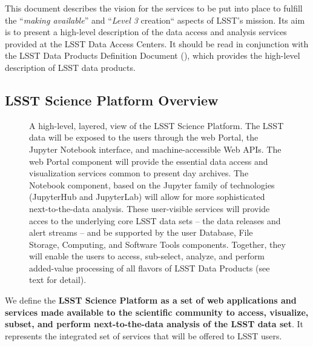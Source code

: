 \documentclass[DM,lsstdraft,toc]{lsstdoc}
\begin{document}
This document describes the vision for the services to be put into place to
fulfill the ``\emph{making available}'' and ``\emph{Level 3} creation``
aspects of LSST's mission. Its aim is to present a high-level
description of the data access and analysis services provided at the
LSST Data Access Centers. It should be read in conjunction with the
LSST Data Products Definition Document (\DPDD), which provides the high-level
description of LSST data products.

\subsection{LSST Science Platform Overview}

\begin{figure}
\centering
{}
\caption{
A high-level, layered, view of the LSST Science Platform.  The LSST data
will be exposed to the users through the web Portal, the Jupyter Notebook
interface, and machine-accessible Web APIs.  The web Portal component will
provide the essential data access and visualization services common to
present day archives.  The Notebook component, based on the Jupyter family
of technologies (JupyterHub and JupyterLab) will allow for more
sophisticated next-to-the-data analysis.  These user-visible services will
provide acces to the underlying core LSST data sets -- the data releases and
alert streams -- and be supported by the user Database, File Storage,
Computing, and Software Tools components.  Together, they will enable the
users to access, sub-select, analyze, and perform added-value processing of
all flavors of LSST Data Products (see text for detail).
\label{fig:layeredLSP}}
\end{figure}

We define the \textbf{LSST Science Platform as a set of web applications and services
made available to the scientific community to access, visualize, subset, and
perform next-to-the-data analysis of the LSST data set}. It represents the integrated
set of services that will be offered to LSST users.
\end{document}
